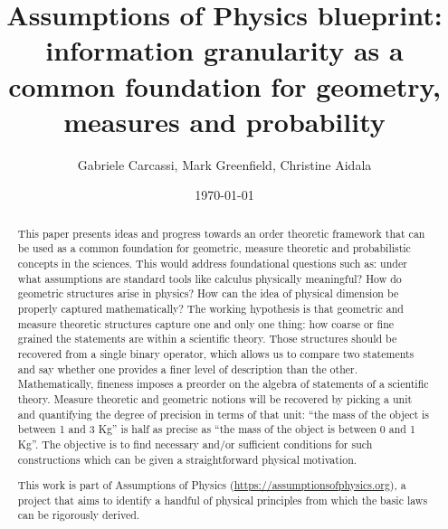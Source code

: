 \documentclass[10pt, onecolumn, nofootinbib]{revtex4-1}
\begin{document}
	


\title{Assumptions of Physics blueprint: information granularity as a common foundation for geometry, measures and probability}
\author{Gabriele Carcassi, Mark Greenfield, Christine Aidala }
\date{\today}

\begin{abstract}
    This paper presents ideas and progress towards an order theoretic framework that can be used as a common foundation for geometric, measure theoretic and probabilistic concepts in the sciences. This would address foundational questions such as: under what assumptions are standard tools like calculus physically meaningful? How do geometric structures arise in physics? How can the idea of physical dimension be properly captured mathematically? The working hypothesis is that geometric and measure theoretic structures capture one and only one thing: how coarse or fine grained the statements are within a scientific theory. Those structures should be recovered from a single binary operator, which allows us to compare two statements and say whether one provides a finer level of description than the other. Mathematically, fineness imposes a preorder on the algebra of statements of a scientific theory. Measure theoretic and geometric notions will be recovered by picking a unit and quantifying the degree of precision in terms of that unit: ``the mass of the object is between 1 and 3 Kg'' is half as precise as ``the mass of the object is between 0 and 1 Kg''. The objective is to find necessary and/or sufficient conditions for such constructions which can be given a straightforward physical motivation.
    
	This work is part of Assumptions of Physics (\url{https://assumptionsofphysics.org}), a project that aims to identify a handful of physical principles from which the basic laws can be rigorously derived.
\end{abstract}
\end{document}
